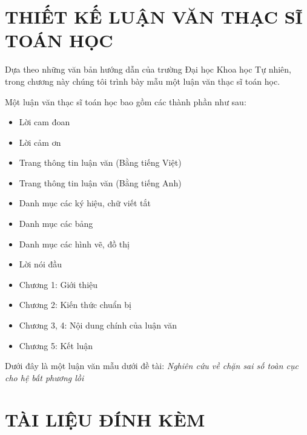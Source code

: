 \chapter{THIẾT KẾ LUẬN VĂN THẠC SĨ TOÁN HỌC}

Dựa theo những văn bản hướng dẫn của trường Đại học Khoa học Tự nhiên, trong chương này chúng tôi trình bày mẫu một luận văn thạc sĩ toán học.

Một luận văn thạc sĩ toán học bao gồm các thành phần như sau:
\begin{itemize}
    \item Lời cam đoan
    \item Lời cảm ơn
    \item Trang thông tin luận văn (Bằng tiếng Việt)
    \item Trang thông tin luận văn (Bằng tiếng Anh)
    \item Danh mục các ký hiệu, chữ viết tắt
    \item Danh mục các bảng
    \item Danh mục các hình vẽ, đồ thị
    \item Lời nói đầu
    \item Chương 1: Giới thiệu
    \item Chương 2: Kiến thức chuẩn bị
    \item Chương 3, 4: Nội dung chính của luận văn
    \item Chương 5: Kết luận
\end{itemize}

Dưới đây là một luận văn mẫu dưới đề tài: \emph{Nghiên cứu về chặn sai số toàn cục cho hệ bất phương lồi}



\chapter{TÀI LIỆU ĐÍNH KÈM}


